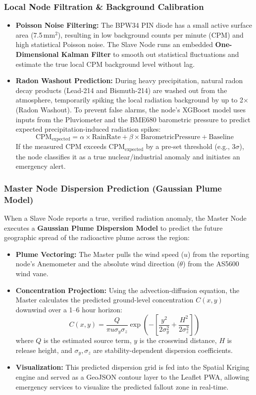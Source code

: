 \documentclass[12pt,a4paper]{article}
\begin{document}
\subsubsection{Local Node Filtration \& Background Calibration}
\begin{itemize}
    \item \textbf{Poisson Noise Filtering:} The BPW34 PIN diode has a small active surface area (7.5\,mm$^2$), resulting in low background counts per minute (CPM) and high statistical Poisson noise. The Slave Node runs an embedded \textbf{One-Dimensional Kalman Filter} to smooth out statistical fluctuations and estimate the true local CPM background level without lag.
    \item \textbf{Radon Washout Prediction:} During heavy precipitation, natural radon decay products (Lead-214 and Bismuth-214) are washed out from the atmosphere, temporarily spiking the local radiation background by up to 2$\times$ (Radon Washout). To prevent false alarms, the node's XGBoost model uses inputs from the Pluviometer and the BME680 barometric pressure to predict expected precipitation-induced radiation spikes:
    \[
    \text{CPM}_{\text{expected}} = \alpha \times \text{RainRate} + \beta \times \text{BarometricPressure} + \text{Baseline}
    \]
    If the measured CPM exceeds $\text{CPM}_{\text{expected}}$ by a pre-set threshold (e.g., $3\sigma$), the node classifies it as a true nuclear/industrial anomaly and initiates an emergency alert.
\end{itemize}

\subsubsection{Master Node Dispersion Prediction (Gaussian Plume Model)}
When a Slave Node reports a true, verified radiation anomaly, the Master Node executes a \textbf{Gaussian Plume Dispersion Model} to predict the future geographic spread of the radioactive plume across the region:
\begin{itemize}
    \item \textbf{Plume Vectoring:} The Master pulls the wind speed ($u$) from the reporting node's Anemometer and the absolute wind direction ($\theta$) from the AS5600 wind vane.
    \item \textbf{Concentration Projection:} Using the advection-diffusion equation, the Master calculates the predicted ground-level concentration $C(x,y)$ downwind over a 1--6 hour horizon:
    \[
    C(x,y) = \frac{Q}{\pi u \sigma_y \sigma_z} \exp\left( -\left[ \frac{y^2}{2\sigma_y^2} + \frac{H^2}{2\sigma_z^2} \right] \right)
    \]
    where $Q$ is the estimated source term, $y$ is the crosswind distance, $H$ is release height, and $\sigma_y, \sigma_z$ are stability-dependent dispersion coefficients.
    \item \textbf{Visualization:} This predicted dispersion grid is fed into the Spatial Kriging engine and served as a GeoJSON contour layer to the Leaflet PWA, allowing emergency services to visualize the predicted fallout zone in real-time.
\end{itemize}
\end{document}
